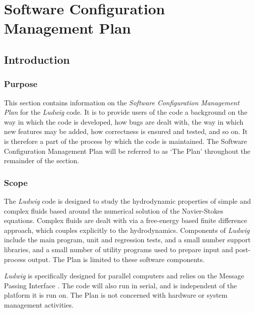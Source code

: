 \documentclass[11pt,twoside]{article}
\begin{document}
\setcounter{page}{1}

\tableofcontents

\newpage

\setcounter{page}{1}

\section{Software Configuration Management Plan}

\subsection{Introduction}

\subsubsection{Purpose}

This section contains information on the \textit{Software Configuration
Management Plan} for the \textit{Ludwig} code.
It is to provide users of the code a background on the way in which
the code is developed, how bugs are dealt with, the way in which
new features may be added, how correctness is ensured and tested, and so on.
It is therefore a part
of the process by which the code is maintained. The Software Configuration
Management Plan will be referred to as `The Plan' throughout the remainder
of the section.

\subsubsection{Scope}

The \textit{Ludwig} code is designed to study the hydrodynamic properties
of simple and complex fluids based around the numerical solution of the
Navier-Stokes equations. Complex fluids are dealt with via a free-energy
based finite difference approach, which couples explicitly to the
hydrodynamics.
Components of \textit{Ludwig} include the main program, unit and
regression tests, and a small number support libraries, and a small
number of utility programs used to prepare
input and post-process output. The Plan is limited to these
software components.

\textit{Ludwig} is specifically designed for parallel computers and
relies on the Message Passing Interface \cite{mpi-standard}. The
code will also run in serial, and is independent of
the platform it is run on. The Plan is not concerned with
hardware or system management activities.
\end{document}
